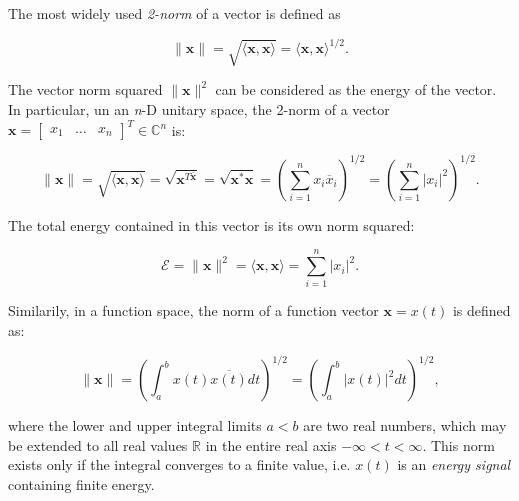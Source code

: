 \documentclass[10pt,b5paper,titlepage]{book}
\begin{document}
\begin{itemize}
\begin{itemize}
                 The most widely used \textit{2-norm} of a vector is defined as

                 \begin{equation}
                     \|\mathbf{x}\| = \sqrt{\langle \mathbf{x}, \mathbf{x} \rangle}
                     = \langle \mathbf{x}, \mathbf{x} \rangle^{1 / 2}
                 .\end{equation}

                 The vector norm squared $\|\mathbf{x}\|^{2}$ can be considered
                 as the energy of the vector. In particular, un an \textit{n}-D
                 unitary space, the 2-norm of a vector
                 $\mathbf{x} = \begin{bmatrix} x_1 & \ldots & x_n \end{bmatrix}^{T} \in \mathbb{C}^{n}$ is:

                 \begin{equation}
                     \|\mathbf{x}\| = \sqrt{\langle \mathbf{x}, \mathbf{x} \rangle}
                     = \sqrt{\mathbf{x}^{T \overline{\mathbf{x}}}}
                     = \sqrt{\mathbf{x}^{*} \mathbf{x}}
                     = \left( \sum_{i=1}^{n} x_{i} \overline{x}_{i} \right)^{1 / 2}
                     = \left( \sum_{i=1}^{n} \left| x_{i} \right|^{2}  \right)^{1 / 2}
                 .\end{equation}

                 The total energy contained in this vector is its own norm squared:

                 \begin{equation}
                     \mathcal{E} = \|\mathbf{x}\|^{2}
                     = \langle \mathbf{x}, \mathbf{x} \rangle
                     = \sum_{i=1}^{n} \left| x_{i} \right|^{2}
                 .\end{equation}

                 Similarily, in a function space, the norm of a function vector
                 $\mathbf{x} = x(t)$ is defined as:

                 \begin{equation}
                     \|\mathbf{x}\|
                     = \left( \int_{a}^{b} x(t) \overline{x(t)} dt  \right)^{1 / 2}
                     = \left( \int_{a}^{b} |x(t)|^{2} dt  \right)^{1 / 2}
                 ,\end{equation}

                 where the lower and upper integral limits $a < b$ are two real
                 numbers, which may be extended to all real values  $\mathbb{R}$
                 in the entire real axis $-\infty < t < \infty$. This norm exists
                 only if the integral converges to a finite value, i.e. $x(t)$
                 is an  \textit{energy signal} containing finite energy.


\end{itemize}
\end{itemize}
\end{document}
